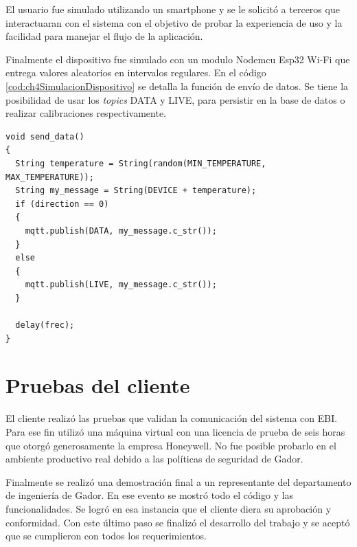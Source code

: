 El usuario fue simulado utilizando un smartphone y se le solicitó a terceros que interactuaran con el sistema con el objetivo de probar la experiencia de uso y la facilidad para manejar el flujo de la aplicación.

Finalmente el dispositivo fue simulado con un modulo Nodemcu Esp32 Wi-Fi que entrega valores aleatorios en intervalos regulares.
En el código \ref{cod:ch4SimulacionDispositivo} se detalla la función de envío de datos.
Se tiene la posibilidad de usar los \emph{topics} DATA y LIVE, para persistir en la base de datos o realizar calibraciones respectivamente.

\begin{lstlisting}[label=cod:ch4SimulacionDispositivo,caption=Función de envío de datos.]
void send_data()
{
  String temperature = String(random(MIN_TEMPERATURE, MAX_TEMPERATURE));
  String my_message = String(DEVICE + temperature);
  if (direction == 0)
  {
    mqtt.publish(DATA, my_message.c_str());
  }
  else
  {
    mqtt.publish(LIVE, my_message.c_str());
  }

  delay(frec);
}
\end{lstlisting}

\section{Pruebas del cliente}

El cliente realizó las pruebas que validan la comunicación del sistema con EBI.
Para ese fin utilizó una máquina virtual con una licencia de prueba de seis horas que otorgó generosamente la empresa Honeywell.
No fue posible probarlo en el ambiente productivo real debido a las políticas de seguridad de Gador.

Finalmente se realizó una demostración final a un representante del departamento de ingeniería de Gador.
En ese evento se mostró todo el código y las funcionalidades.
Se logró en esa instancia que el cliente diera su aprobación y conformidad.
Con este último paso se finalizó el desarrollo del trabajo y se aceptó que se cumplieron con todos los requerimientos.
